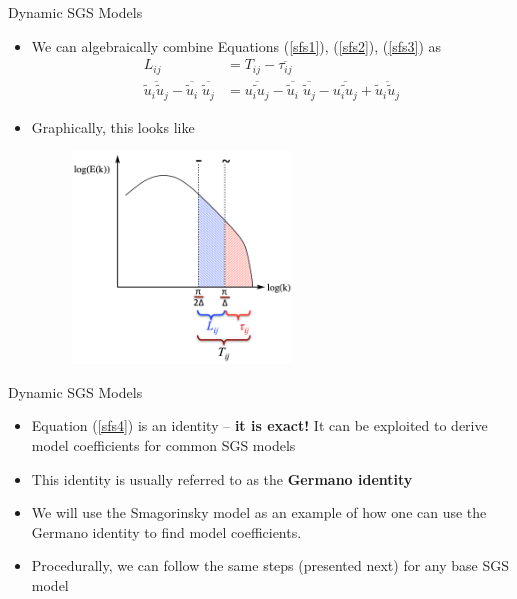 \begin{frame}{Dynamic SGS Models}
\begin{itemize}
	\item We can algebraically combine Equations (\ref{sfs1}), (\ref{sfs2}), (\ref{sfs3}) as 
	\begin{align}
	\label{sfs4}
	L_{ij} &= T_{ij} - \overline{\tau_{ij}}\\
	\overline{\widetilde{u}_i\widetilde{u}_j} - \overline{\widetilde{u}_i}\;\overline{\widetilde{u}_j} &= \overline{\widetilde{u_i u_j}} - \overline{\widetilde{u}_i}\; \overline{\widetilde{u}_j} - \overline{\widetilde{u_i u_j}} + \overline{\widetilde{u}_i\widetilde{u}_j}\nonumber
	\end{align}
	\item Graphically, this looks like
	\begin{figure}
	\includegraphics[width=0.55\textwidth]{germano1}
	\end{figure}
\end{itemize}
\end{frame}

\begin{frame}{Dynamic SGS Models}
\begin{itemize}
	\item Equation (\ref{sfs4}) is an identity -- \textbf{it is exact!} It can be exploited to derive model coefficients for common SGS models
	\item This identity is usually referred to as the \textbf{Germano identity}
	\item We will use the Smagorinsky model as an example of how one can use the Germano identity to find model coefficients. 
	\item Procedurally, we can follow the same steps (presented next) for any base SGS model
\end{itemize}
\end{frame}

